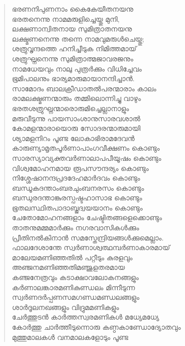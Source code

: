 \begin{verse}
ഭരണനിപുണനാം കൈകേയീതനയനു\\
ഭരതനെന്നു നാമമരുളിച്ചെയ്തു മുനി,\\
ലക്ഷണാന്വിതനായ സുമിത്രാതനയനു\\
ലക്ഷ്മണനെന്നു തന്നെ നാമവുമരുള്‍ചെയ്തു;\\
ശത്രുവൃന്ദത്തെ ഹനിച്ചീടുക നിമിത്തമായ്\\
ശത്രുഘ്നനെന്നു സുമിത്രാത്മജാവരജനും\\
നാമധേയവും നാലു പുത്രര്‍ക്കും വിധിച്ചേവം\\
ഭൂമിപാലനും ഭാര്യമാരുമായാനന്ദിച്ചാന്‍.\\
സാമോദം ബാലക്രീഡാതല്‍പരന്മാരാം കാലം\\
രാമലക്ഷ്മണന്മാരും തമ്മിലൊന്നിച്ചു വാഴും\\
ഭരതശത്രുഘ്നന്മാരൊരുമിച്ചെല്ലാനാളും\\
മരുവീടുന്നു പായസാംശാനുസാരവശാല്‍\\
കോമളന്മാരായൊരു സോദരന്മാരുമായി\\
ശ്യാമളനിറം പൂണ്ട ലോകാഭിരാമദേവന്‍\\
കാരുണ്യാമൃതപൂര്‍ണാപാംഗവീക്ഷണം കൊണ്ടും\\
സാരസ്യാവ്യക്തവര്‍ണാലാപപീയൂഷം കൊണ്ടും\\
വിശ്വമോഹനമായ രൂപസൗന്ദര്യം കൊണ്ടും\\
നിശ്ശേഷാനന്ദപ്രദദേഹമാര്‍ദവം കൊണ്ടും\\
ബന്ധൂകദന്താംബരചുംബനരസം കൊണ്ടും\\
ബന്ധുരദന്താങ്കുരസ്പഷ്ടഹാസാഭ കൊണ്ടും\\
ഭൂതലസ്ഥിതപാദാബ്ജദ്വയയാനം കൊണ്ടും\\
ചേതോമോഹനങ്ങളാം ചേഷ്ടിതങ്ങളെക്കൊണ്ടും\\
താതനുമമ്മമാര്‍ക്കും നഗരവാസികള്‍ക്കും\\
പ്രീതിനല്‍കിനാന്‍ സമസ്തേന്ദ്രിയങ്ങള്‍ക്കുമെല്ലാം.\\
ഫാലദേശാന്തേ സ്വര്‍ണാശ്വത്ഥമ്പര്‍ണാകാരമായ്\\
മാലേയമണിഞ്ഞതില്‍ പറ്റീടും കുരളവും\\
അഞ്ജനമണിഞ്ഞതിമഞ്ജുളതരമായ\\
കഞ്ജനേത്രവും കടാക്ഷാവലോകനങ്ങളും\\
കര്‍ണാലങ്കാരമണികുണ്ഡലം മിന്നീടുന്ന\\
സ്വര്‍ണദര്‍പ്പണസമഗണ്ഡമണ്ഡലങ്ങളും\\
ശാര്‍ദൂലനഖങ്ങളും വിദ്രുമമണികളും\\
ചേര്‍ത്തുടന്‍ കാര്‍ത്തസ്വരമണികള്‍ മധ്യേമധ്യേ\\
കോര്‍ത്തു ചാര്‍ത്തീടുന്നൊരു കണ്ഠകാണ്ഡോദ്യോതവും\\
മുത്തുമാലകള്‍ വനമാലകളോടും പൂണ്ട\\

\end{verse}
